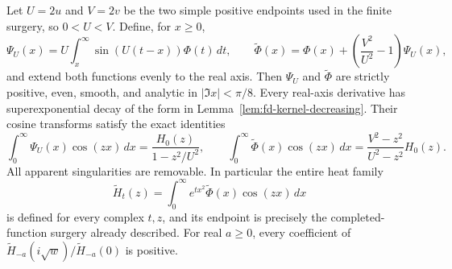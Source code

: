 \begin{proposition}
\label{prop:fd-positive-surgery}
Let \(U=2u\) and \(V=2v\) be the two simple positive endpoints
used in the finite surgery, so \(0<U<V\). Define, for \(x\ge0\),
\[
 \Psi_U(x)=U\int_x^\infty\sin(U(t-x))\Phi(t)\,dt,
 \qquad
 \widetilde\Phi(x)=\Phi(x)+
                   \left(\frac{V^2}{U^2}-1\right)\Psi_U(x),
\]
and extend both functions evenly to the real axis.
Then \(\Psi_U\) and \(\widetilde\Phi\) are strictly positive,
even, smooth, and analytic in \(|\Im x|<\pi/8\).
Every real-axis derivative has superexponential decay of the
form in Lemma~\ref{lem:fd-kernel-decreasing}. Their cosine transforms
satisfy the exact identities
\[
 \int_0^\infty\Psi_U(x)\cos(zx)\,dx
       =\frac{H_0(z)}{1-z^2/U^2},\qquad
 \int_0^\infty\widetilde\Phi(x)\cos(zx)\,dx
       =\frac{V^2-z^2}{U^2-z^2}H_0(z).
\]
All apparent singularities are removable. In particular the entire
heat family
\[
 \widetilde H_t(z)=\int_0^\infty
                e^{t x^2}\widetilde\Phi(x)\cos(zx)\,dx
\]
is defined for every complex \(t,z\), and its endpoint is precisely
the completed-function surgery already described.
For real \(a\ge0\), every coefficient of
\(\widetilde H_{-a}(i\sqrt w)/\widetilde H_{-a}(0)\) is positive.
\end{proposition}

